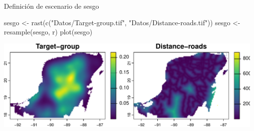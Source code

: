 \documentclass[
  11pt,
  ignorenonframetext,
]{beamer}
\newenvironment{Shaded}{}{}
\newcommand{\FunctionTok}[1]{\textcolor[rgb]{0.02,0.16,0.49}{#1}}
\newcommand{\NormalTok}[1]{#1}
\newcommand{\OtherTok}[1]{\textcolor[rgb]{0.00,0.44,0.13}{#1}}
\newcommand{\StringTok}[1]{\textcolor[rgb]{0.25,0.44,0.63}{#1}}
\begin{document}
\begin{frame}[fragile]{Definición de escenario de sesgo}
\protect\hypertarget{definiciuxf3n-de-escenario-de-sesgo}{}
\begin{Shaded}
\begin{Highlighting}[]
\NormalTok{sesgo }\OtherTok{\textless{}{-}} \FunctionTok{rast}\NormalTok{(}\FunctionTok{c}\NormalTok{(}\StringTok{"Datos/Target{-}group.tif"}\NormalTok{, }
                \StringTok{"Datos/Distance{-}roads.tif"}\NormalTok{))}
\NormalTok{sesgo }\OtherTok{\textless{}{-}} \FunctionTok{resample}\NormalTok{(sesgo, r)}
\FunctionTok{plot}\NormalTok{(sesgo)}
\end{Highlighting}
\end{Shaded}

\begin{center}\includegraphics{Tutorial-spatstat-2_files/figure-beamer/unnamed-chunk-22-1} \end{center}
\end{frame}
\end{document}
